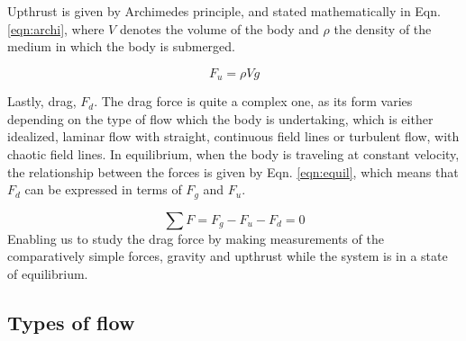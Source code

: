\documentclass[11pt,a4paper]{article}
\begin{document}
    Upthrust is given by Archimedes principle, and stated mathematically in Eqn. \ref{eqn:archi}, where $V$ denotes the volume of the body and $\rho$ the density of the medium in which the body is submerged.

    \begin{equation}
      F_u = \rho V g
      \label{eqn:archi}
    \end{equation}

    Lastly, drag, $F_d$. The drag force is quite a complex one, as its form varies depending on the type of flow which the body is undertaking, which is either idealized, laminar flow with straight, continuous field lines or turbulent flow, with chaotic field lines.
    In equilibrium, when the body is traveling at constant velocity, the relationship between the forces is given by Eqn. \ref{eqn:equil}, which means that $F_d$ can be expressed in terms of $F_g$ and $F_u$.
    
    \begin{equation}
      \sum F = F_g - F_u - F_d = 0
      \label{eqn:equil}
    \end{equation}
    Enabling us to study the drag force by making measurements of the comparatively simple forces, gravity and upthrust while the system is in a state of equilibrium.

    \subsection{Types of flow}
    
\end{document}
